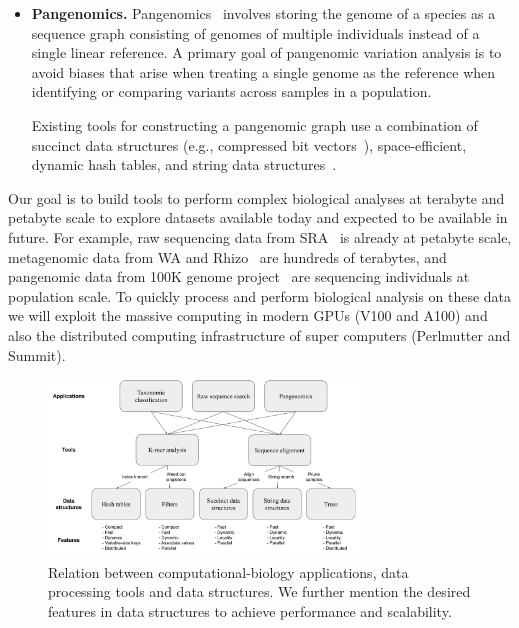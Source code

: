 \begin{itemize}[leftmargin=*]
\item {\bf Pangenomics.}
Pangenomics~\cite{garrison2018variation} involves storing the genome of a species as a sequence graph consisting of genomes of multiple individuals instead of a single linear reference. A primary goal of pangenomic variation analysis is to avoid biases that arise when treating a single genome as the reference when identifying or comparing variants across samples in a population.

Existing tools for constructing a pangenomic graph use a combination of succinct data structures (e.g., compressed bit vectors~\cite{garrison2018variation}), space-efficient, dynamic hash tables, and string data structures~\cite{pandey2021variantstore}.

\end{itemize}



Our goal is to build tools to perform complex biological analyses at terabyte and petabyte scale to explore datasets available today and expected to be available in future. For example, raw sequencing data from SRA~\cite{kodama2012sequence} is already at petabyte scale, metagenomic data from WA and Rhizo~\cite{hofmeyr2020terabase} are hundreds of terabytes, and pangenomic data from 100K genome project~\cite{XXX} are sequencing individuals at population scale. To quickly process and perform biological analysis on these data we will exploit the massive computing in modern GPUs (V100 and A100) and also the distributed computing infrastructure of super computers (Perlmutter and Summit).


\begin{figure}
\centering
\includegraphics[width=0.75\textwidth]{images/PPOSS_App_DS}
\caption{Relation between computational-biology applications, data processing tools and data structures. We further mention the desired features in data structures to achieve performance and scalability.}
\label{fig1}
\end{figure}


